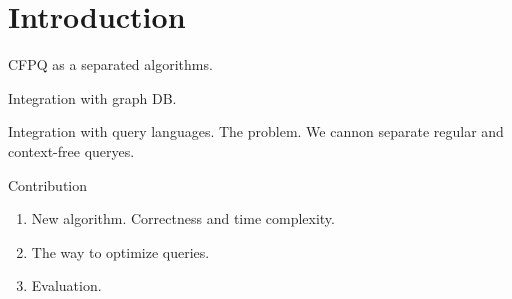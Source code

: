 \section{Introduction}

CFPQ as a separated algorithms.

Integration with graph DB.

Integration with query languages. 
The problem. We cannon separate regular and context-free queryes. 

Contribution
\begin{enumerate}
	\item New algorithm. Correctness and time complexity.
	\item The way to optimize queries.
	\item Evaluation.
\end{enumerate}



